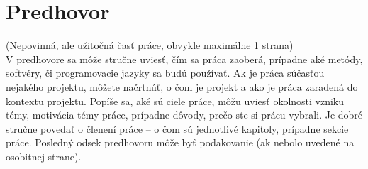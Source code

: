 \chapter*{Predhovor}

(Nepovinná, ale užitočná časť práce, obvykle maximálne 1 strana)\\

V predhovore sa môže stručne uviesť, čím sa práca zaoberá, prípadne aké metódy, softvéry, či programovacie jazyky sa budú používať. Ak je práca súčasťou nejakého projektu, môžete načrtnúť, o čom je projekt a ako je práca zaradená do kontextu projektu. Popíše sa, aké sú ciele práce, môžu uviesť okolnosti vzniku témy, motivácia témy práce, prípadne dôvody, prečo ste si prácu vybrali. Je dobré stručne povedať o členení práce -- o čom sú jednotlivé kapitoly, prípadne sekcie práce. Posledný odsek predhovoru môže byť poďakovanie (ak nebolo uvedené na osobitnej strane).
